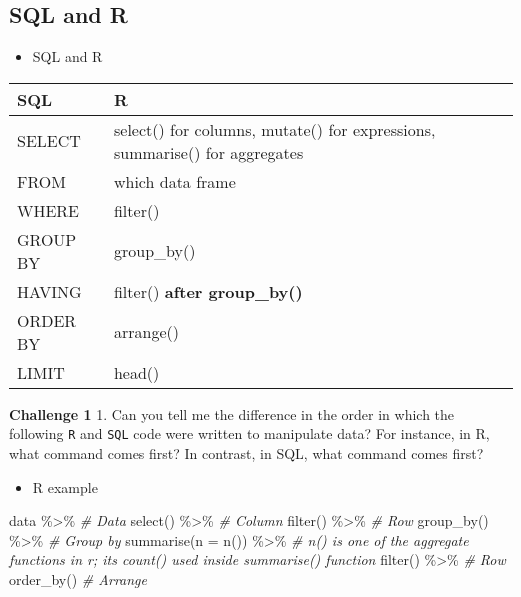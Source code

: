 \documentclass[
]{book}
\newenvironment{Shaded}{\begin{snugshade}}{\end{snugshade}}
\newcommand{\AttributeTok}[1]{\textcolor[rgb]{0.77,0.63,0.00}{#1}}
\newcommand{\CommentTok}[1]{\textcolor[rgb]{0.56,0.35,0.01}{\textit{#1}}}
\newcommand{\FunctionTok}[1]{\textcolor[rgb]{0.00,0.00,0.00}{#1}}
\newcommand{\NormalTok}[1]{#1}
\newcommand{\SpecialCharTok}[1]{\textcolor[rgb]{0.00,0.00,0.00}{#1}}
\providecommand{\tightlist}{%
  \setlength{\itemsep}{0pt}\setlength{\parskip}{0pt}}
\begin{document}
\hypertarget{sql-and-r}{%
\subsection{SQL and R}\label{sql-and-r}}

\begin{itemize}
\tightlist
\item
  SQL and R
\end{itemize}

\begin{longtable}[]{@{}
  >{\raggedright\arraybackslash}p{}
  >{\raggedright\arraybackslash}p{}@{}}
\toprule
SQL & R \\
\midrule
\endhead
SELECT & select() for columns, mutate() for expressions, summarise() for aggregates \\
FROM & which data frame \\
WHERE & filter() \\
GROUP BY & group\_by() \\
HAVING & filter() \textbf{after group\_by()} \\
ORDER BY & arrange() \\
LIMIT & head() \\
\bottomrule
\end{longtable}

\textbf{Challenge 1}
1. Can you tell me the difference in the order in which the following \texttt{R} and \texttt{SQL} code were written to manipulate data? For instance, in R, what command comes first? In contrast, in SQL, what command comes first?

\begin{itemize}
\tightlist
\item
  R example
\end{itemize}

\begin{Shaded}
\begin{Highlighting}[]

\NormalTok{data }\SpecialCharTok{\%\textgreater{}\%} \CommentTok{\# Data }
  \FunctionTok{select}\NormalTok{() }\SpecialCharTok{\%\textgreater{}\%} \CommentTok{\# Column}
  \FunctionTok{filter}\NormalTok{() }\SpecialCharTok{\%\textgreater{}\%} \CommentTok{\# Row }
  \FunctionTok{group\_by}\NormalTok{() }\SpecialCharTok{\%\textgreater{}\%} \CommentTok{\# Group by }
  \FunctionTok{summarise}\NormalTok{(}\AttributeTok{n =} \FunctionTok{n}\NormalTok{()) }\SpecialCharTok{\%\textgreater{}\%} \CommentTok{\# n() is one of the aggregate functions in r; it\textquotesingle{}s count() used inside summarise() function }
  \FunctionTok{filter}\NormalTok{() }\SpecialCharTok{\%\textgreater{}\%} \CommentTok{\# Row }
  \FunctionTok{order\_by}\NormalTok{() }\CommentTok{\# Arrange }
\end{Highlighting}
\end{Shaded}
\end{document}
